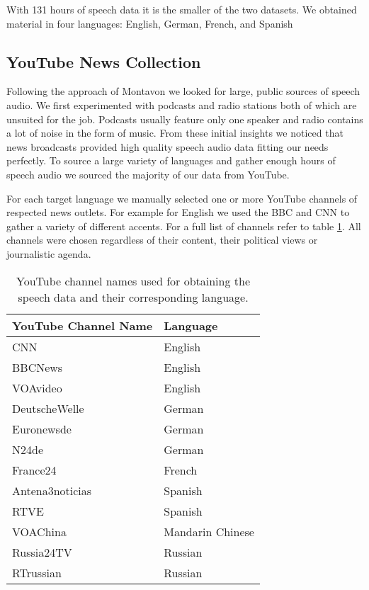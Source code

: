 		With 131 hours of speech data it is the smaller of the two datasets. We obtained material in four languages: English, German, French, and Spanish

\subsection{YouTube News Collection}
\label{sec:youtube_news}

	Following the approach of Montavon \cite{montavon2009deep} we looked for large, public sources of speech audio. We first experimented with podcasts and radio stations both of which are unsuited for the job. Podcasts usually feature only one speaker and radio contains a lot of noise in the form of music. From these initial insights we noticed that news broadcasts provided high quality speech audio data fitting our needs perfectly. To source a large variety of languages and gather enough hours of speech audio we sourced the majority of our data from YouTube. 
	
	For each target language we manually selected one or more YouTube channels of respected news outlets. For example for English we used the BBC and CNN to gather a variety of different accents. For a full list of channels refer to table \ref{tab:channels}. All channels were chosen regardless of their content, their political views or journalistic agenda.
	
	\begin{table}[]
	\centering
	\begin{tabularx}{\textwidth}{ll}
	\toprule
	YouTube Channel Name  & Language \\ \midrule
	CNN                   & English \\
	BBCNews               & English \\
	VOAvideo              & English \\
	DeutscheWelle         & German \\
	Euronewsde            & German \\
	N24de                 & German \\
	France24              & French \\
	Antena3noticias       & Spanish \\
	RTVE                  & Spanish \\
	VOAChina              & Mandarin Chinese  \\
	Russia24TV            & Russian \\
	RTrussian             & Russian \\ \bottomrule
	\end{tabularx}
	\caption{YouTube channel names used for obtaining the speech data and their corresponding language.}
	\label{tab:channels}
	\end{table}

